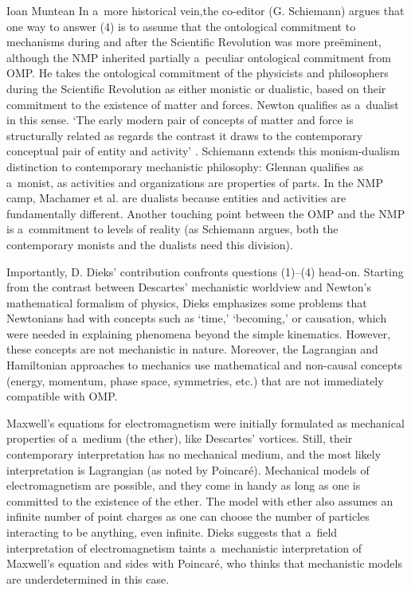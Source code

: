 \begin{recengenv}{Ioan Muntean}
In a~more historical vein,the co-editor (G. Schiemann) argues that one way to answer (4) is to assume that the ontological commitment to mechanisms during and after the Scientific Revolution was more preëminent, although the NMP inherited partially a~peculiar ontological commitment from OMP. He takes the ontological commitment of the physicists and philosophers during the Scientific Revolution as either monistic or dualistic, based on their commitment to the existence of matter and forces. Newton qualifies as a~dualist in this sense. ‘The early modern pair of concepts of matter and force is structurally related as regards the contrast it draws to the contemporary conceptual pair of entity and activity'
\parencite*[][p.43]{falkenburg_mechanistic_2019}. %
 Schiemann extends this monism-dualism distinction to contemporary mechanistic philosophy: Glennan qualifies as a~monist, as activities and organizations are properties of parts. In the NMP camp, Machamer et al. are dualists because entities and activities are fundamentally different. Another touching point between the OMP and the NMP is a~commitment to levels of reality (as Schiemann argues, both the contemporary monists and the dualists need this division).

Importantly, D. Dieks' contribution confronts questions (1)–(4) head-on. Starting from the contrast between Descartes' mechanistic worldview and Newton's mathematical formalism of physics, Dieks emphasizes some problems that Newtonians had with concepts such as ‘time,' ‘becoming,' or causation, which were needed in explaining phenomena beyond the simple kinematics. However, these concepts are not mechanistic in nature. Moreover, the Lagrangian and Hamiltonian approaches to mechanics use mathematical and non-causal concepts (energy, momentum, phase space, symmetries, etc.) that are not immediately compatible with OMP.

Maxwell's equations for electromagnetism were initially formulated as mechanical properties of a~medium (the ether), like Descartes' vortices. Still, their contemporary interpretation has no mechanical medium, and the most likely interpretation is Lagrangian (as noted by Poincaré). Mechanical models of electromagnetism are possible, and they come in handy as long as one is committed to the existence of the  ether. The model with ether also assumes an infinite number of point charges as one can choose the number of particles interacting to be anything, even infinite. Dieks suggests that a~field interpretation of electromagnetism taints a~mechanistic interpretation of Maxwell's equation and sides with Poincaré, who thinks that mechanistic models are underdetermined in this case.


\end{recengenv}
